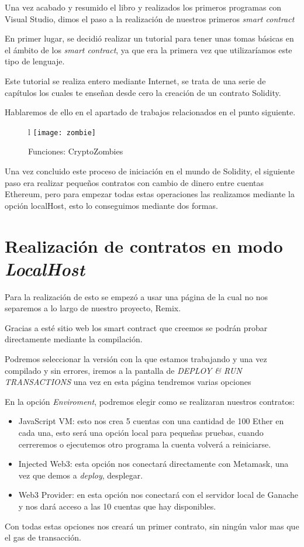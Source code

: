 Una vez acabado y resumido el libro y realizados los primeros programas con Visual Studio, dimos el paso a la realización de nuestros primeros \textit{smart contract} 

En primer lugar, se decidió realizar un tutorial para tener unas tomas básicas en el ámbito de los \textit{smart contract}, ya que era la primera vez que utilizaríamos este tipo de lenguaje.

Este tutorial se realiza entero mediante Internet, se trata de una serie de capítulos los cuales te enseñan desde cero la creación de un contrato Solidity.

Hablaremos de ello en el apartado de trabajos relacionados en el punto siguiente.

\begin{figure}{l}
  \centering
  \texttt{[image: zombie]}
  \caption{Funciones: CryptoZombies}
\end{figure}  

Una vez concluido este proceso de iniciación en el mundo de Solidity, el siguiente paso era realizar pequeños contratos con cambio de dinero entre cuentas Ethereum, pero para empezar todas estas operaciones las realizamos mediante la opción localHost, esto lo conseguimos mediante dos formas.

\section{Realización de contratos en modo \textit{LocalHost}}

Para la realización de esto se empezó a usar una página de la cual no nos separemos a lo largo de nuestro proyecto, Remix.

Gracias a esté sitio web los smart contract que creemos se podrán probar directamente mediante la compilación.

Podremos seleccionar la versión con la que estamos trabajando y una vez compilado y sin errores, iremos a la pantalla de \textit{DEPLOY \& RUN TRANSACTIONS} una vez en esta página tendremos varias opciones 

En la opción \textit{Enviroment}, podremos elegir como se realizaran nuestros contratos:
\begin{itemize}
	\item JavaScript VM: esto nos crea 5 cuentas con una cantidad de 100 Ether en cada una, esto será una opción local para pequeñas pruebas, cuando cerreremos o ejecutemos otro programa la cuenta volverá a reiniciarse.
	\item Injected Web3: esta opción nos conectará directamente con Metamask, una vez que demos a \textit{deploy}, desplegar.
	\item Web3 Provider: en esta opción nos conectará con el servidor local de Ganache y nos dará acceso a las 10 cuentas que hay disponibles.
\end{itemize}
Con todas estas opciones nos creará un primer contrato, sin ningún valor mas que el gas de transacción.

